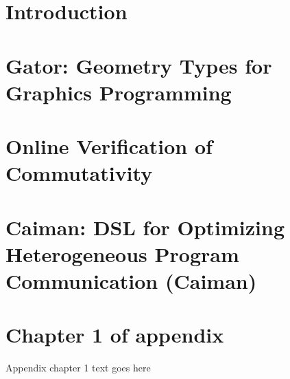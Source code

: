 \documentclass[phd,tocprelim]{cornell}
\begin{document}
\normalspacing \setcounter{page}{1} 
\pagestyle{cornell} \addtolength{\parskip}{0.5\baselineskip}

\chapter{Introduction}

%

\chapter{Gator: Geometry Types for Graphics Programming}

%

\chapter{Online Verification of Commutativity}

%

\chapter{Caiman: DSL for Optimizing Heterogeneous Program Communication (Caiman)}



\appendix
\chapter{Chapter 1 of appendix}
Appendix chapter 1 text goes here



\end{document}
